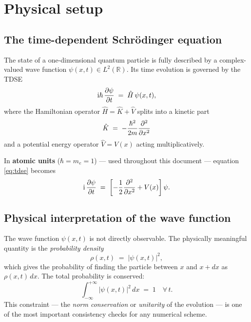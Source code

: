 \documentclass[12pt, a4paper]{article}
\newcommand{\ii}{\mathrm{i}}          %
\newcommand{\Htop}{\hat{H}}
\newcommand{\Ktop}{\hat{K}}
\newcommand{\Vtop}{\hat{V}}
\begin{document}
\section{Physical setup}

\subsection{The time-dependent Schr\"{o}dinger equation}

The state of a one-dimensional quantum particle is fully described by a
complex-valued wave function $\psi(x,t) \in L^2(\mathbb{R})$.  Its
time evolution is governed by the TDSE
\begin{equation}
  \ii\hbar\,\pdv{\psi}{t}(x,t) \;=\; \Htop\,\psi(x,t),
  \label{eq:tdse}
\end{equation}
where the Hamiltonian operator $\Htop = \Ktop + \Vtop$ splits into a
kinetic part
\begin{equation}
  \Ktop \;=\; -\frac{\hbar^2}{2m}\pdv[2]{}{x}
\end{equation}
and a potential energy operator $\Vtop = V(x)$ acting multiplicatively.

In \textbf{atomic units} ($\hbar = m_e = 1$) — used throughout this
document — equation \eqref{eq:tdse} becomes
\begin{equation}
  \ii\,\pdv{\psi}{t} \;=\;
  \left[-\frac{1}{2}\pdv[2]{}{x} + V(x)\right]\psi.
  \label{eq:tdse_au}
\end{equation}

\subsection{Physical interpretation of the wave function}

The wave function $\psi(x,t)$ is not directly observable.  The physically
meaningful quantity is the \emph{probability density}
\begin{equation}
  \rho(x,t) \;=\; |\psi(x,t)|^2,
\end{equation}
which gives the probability of finding the particle between $x$ and $x+dx$
as $\rho(x,t)\,dx$.  The total probability is conserved:
\begin{equation}
  \int_{-\infty}^{+\infty} |\psi(x,t)|^2\,dx \;=\; 1
  \quad \forall\, t.
  \label{eq:norm}
\end{equation}
This constraint — the \emph{norm conservation} or \emph{unitarity} of the
evolution — is one of the most important consistency checks for any
numerical scheme.
\end{document}
